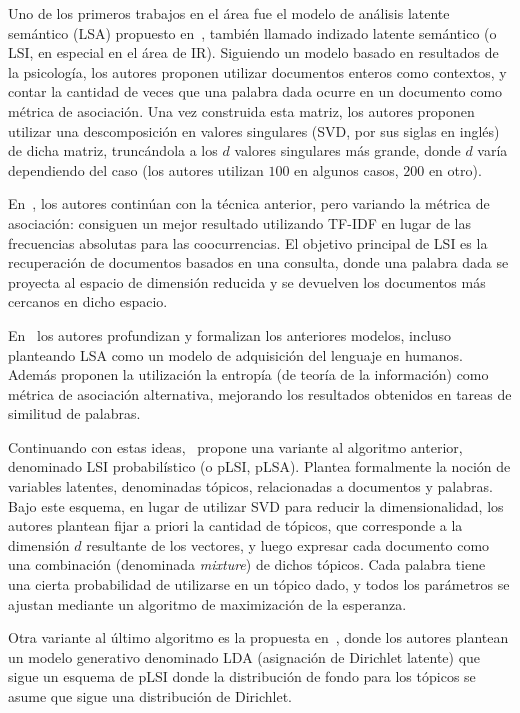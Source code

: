 Uno de los primeros trabajos en el área fue el modelo de análisis latente semántico (LSA) propuesto
en~\cite{Dumais1988}, también llamado indizado latente semántico (o LSI, en especial en el área de
IR). Siguiendo un modelo basado en resultados de la psicología, los autores proponen utilizar
documentos enteros como contextos, y contar la cantidad de veces que una palabra dada ocurre en un
documento como métrica de asociación. Una vez construida esta matriz, los autores proponen utilizar
una descomposición en valores singulares (SVD, por sus siglas en inglés) de dicha matriz,
truncándola a los $d$ valores singulares más grande, donde $d$ varía dependiendo del caso (los
autores utilizan $100$ en algunos casos, $200$ en otro).

En~\cite{Deerwester1990}, los autores continúan con la técnica anterior, pero variando la métrica de
asociación: consiguen un mejor resultado utilizando TF-IDF en lugar de las frecuencias absolutas
para las coocurrencias. El objetivo principal de LSI es la recuperación de documentos basados en una
consulta, donde una palabra dada se proyecta al espacio de dimensión reducida y se devuelven los
documentos más cercanos en dicho espacio.

En~\cite{LandauerDumais1997} los autores profundizan y formalizan los anteriores modelos, incluso
planteando LSA como un modelo de adquisición del lenguaje en humanos. Además proponen la utilización
la entropía (de teoría de la información) como métrica de asociación alternativa, mejorando los
resultados obtenidos en tareas de similitud de palabras.

Continuando con estas ideas,~\cite{Hoffman1999} propone una variante al algoritmo anterior,
denominado LSI probabilístico (o pLSI, pLSA). Plantea formalmente la noción de variables latentes,
denominadas tópicos, relacionadas a documentos y palabras. Bajo este esquema, en lugar de utilizar
SVD para reducir la dimensionalidad, los autores plantean fijar a priori la cantidad de tópicos, que
corresponde a la dimensión $d$ resultante de los vectores, y luego expresar cada documento como una
combinación (denominada \textit{mixture}) de dichos tópicos. Cada palabra tiene una cierta
probabilidad de utilizarse en un tópico dado, y todos los parámetros se ajustan mediante un
algoritmo de maximización de la esperanza.

Otra variante al último algoritmo es la propuesta en~\cite{Blei2003}, donde los autores plantean un
modelo generativo denominado LDA (asignación de Dirichlet latente) que sigue un esquema de pLSI
donde la distribución de fondo para los tópicos se asume que sigue una distribución de Dirichlet.


